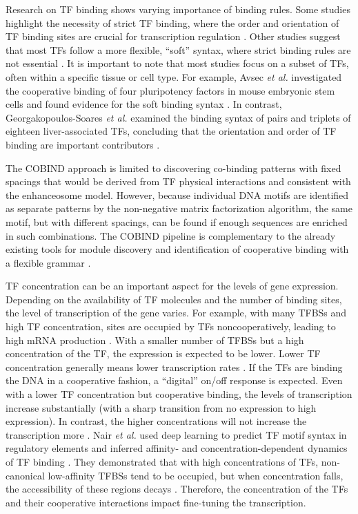     Research on TF binding shows varying importance of binding rules. Some studies highlight the necessity of strict TF binding, where the order and orientation of TF binding sites are crucial for transcription regulation \cite{georgakopoulos2023transcription}. Other studies suggest that most TFs follow a more flexible, ``soft'' syntax, where strict binding rules are not essential \cite{avsec2021base}. It is important to note that most studies focus on a subset of TFs, often within a specific tissue or cell type. For example, Avsec \textit{et al.} investigated the cooperative binding of four pluripotency factors in mouse embryonic stem cells and found evidence for the soft binding syntax \cite{avsec2021base}. In contrast, Georgakopoulos-Soares \textit{et al.} examined the binding syntax of pairs and triplets of eighteen liver-associated TFs, concluding that the orientation and order of TF binding are important contributors \cite{georgakopoulos2023transcription}.

    The COBIND approach is limited to discovering co-binding patterns with fixed spacings that would be derived from TF physical interactions and consistent with the enhanceosome model. However, because individual DNA motifs are identified as separate patterns by the non-negative matrix factorization algorithm, the same motif, but with different spacings, can be found if enough sequences are enriched in such combinations. The COBIND pipeline is complementary to the already existing tools for module discovery and identification of cooperative binding with a flexible grammar \cite{zhou2004cismodule,biswas2021universal}.

    TF concentration can be an important aspect for the levels of gene expression. Depending on the availability of TF molecules and the number of binding sites, the level of transcription of the gene varies. For example, with many TFBSs and high TF concentration, sites are occupied by TFs noncooperatively, leading to high mRNA production \cite{giorgetti2010noncooperative}. With a smaller number of TFBSs but a high concentration of the TF, the expression is expected to be lower. Lower TF concentration generally means lower transcription rates \cite{giorgetti2010noncooperative}. If the TFs are binding the DNA in a cooperative fashion, a ``digital'' on/off response is expected. Even with a lower TF concentration but cooperative binding, the levels of transcription increase substantially (with a sharp transition from no expression to high expression). In contrast, the higher concentrations will not increase the transcription more \cite{giorgetti2010noncooperative}. Nair \textit{et al.} used deep learning to predict TF motif syntax in regulatory elements and inferred affinity- and concentration-dependent dynamics of TF binding \cite{nair2023transcription}. They demonstrated that with high concentrations of TFs, non-canonical low-affinity TFBSs tend to be occupied, but when concentration falls, the accessibility of these regions decays \cite{nair2023transcription}. Therefore, the concentration of the TFs and their cooperative interactions impact fine-tuning the transcription.

